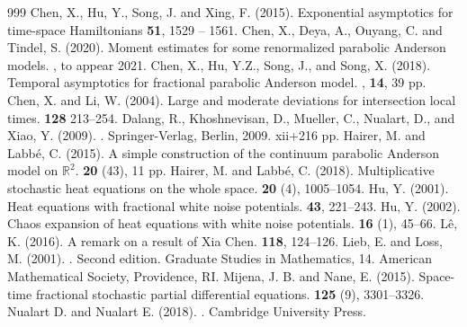 \documentclass[a4paper,11pt]{article}
\numberwithin{equation}{section}
\numberwithin{equation}{section}
\theoremstyle{plain}
\theoremstyle{definition}
\newcommand{\R}{\mathbb{R}}
\begin{document}
\begin{thebibliography}{999}
  Chen, X., Hu, Y., Song, J. and Xing, F. (2015).
  \newblock Exponential asymptotics for time-space Hamiltonians
   \textbf{51}, 1529 -- 1561.
  Chen, X., Deya, A., Ouyang, C. and Tindel, S. (2020).
  \newblock Moment estimates for some renormalized parabolic Anderson models.
  , to appear 2021.
  Chen, X., Hu, Y.Z., Song, J., and Song, X. (2018).
  \newblock Temporal asymptotics for fractional parabolic Anderson model.
  , {\bf 14}, 39 pp.
  Chen, X. and Li, W. (2004).
  \newblock Large and moderate deviations for intersection local times.
   {\bf 128} 213--254.
  Dalang, R., Khoshnevisan, D., Mueller, C., Nualart, D., and Xiao, Y. (2009).
  .
  \newblock Springer-Verlag, Berlin, 2009. xii+216 pp.
  Hairer, M. and Labb\'e, C. (2015).
  \newblock A simple construction of the continuum parabolic Anderson model on $\R^2$.
   \textbf{20} (43), 11 pp.
  Hairer, M. and Labb\'e, C. (2018).
  \newblock Multiplicative stochastic heat equations on the whole space.
   \textbf{20} (4), 1005--1054.
  Hu, Y. (2001).
  \newblock Heat equations with fractional white noise potentials.
   \textbf{43}, 221--243.
  Hu, Y. (2002).
  \newblock Chaos expansion of heat equations with white noise potentials.
   \textbf{16} (1), 45--66.
  L\^e, K. (2016).
  \newblock A remark on a result of Xia Chen.
   {\bf 118}, 124--126.
  Lieb, E. and Loss, M. (2001).
  . Second edition.
  \newblock Graduate Studies in Mathematics, 14. American Mathematical Society, Providence, RI.
  Mijena, J. B. and Nane, E. (2015).
  \newblock Space-time fractional stochastic partial differential equations.
   \textbf{125} (9), 3301--3326.
  Nualart D. and Nualart E. (2018).
  .
  \newblock Cambridge University Press.
\end{thebibliography}
\end{document}
